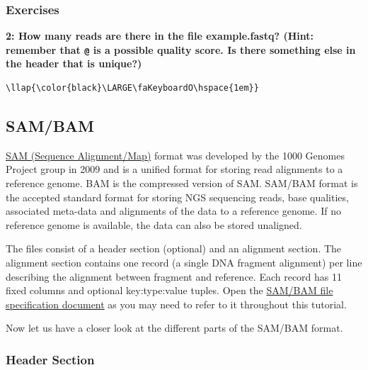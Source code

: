 \documentclass[11pt]{article}
\begin{document}
\hypertarget{exercises}{%
\subsubsection{Exercises}\label{exercises}}

\textbf{2: How many reads are there in the file example.fastq? (Hint:
remember that \texttt{@} is a possible quality score. Is there something
else in the header that is unique?)}

\begin{terminalinput}
\begin{Verbatim}[commandchars=\\\{\}]
\llap{\color{black}\LARGE\faKeyboardO\hspace{1em}}
\end{Verbatim}
\end{terminalinput}

    \hypertarget{sambam}{%
\subsection{SAM/BAM}\label{sambam}}

\href{https://samtools.github.io/hts-specs/SAMv1.pdf}{SAM (Sequence
Alignment/Map)} format was developed by the 1000 Genomes Project group
in 2009 and is a unified format for storing read alignments to a
reference genome. BAM is the compressed version of SAM. SAM/BAM format
is the accepted standard format for storing NGS sequencing reads, base
qualities, associated meta-data and alignments of the data to a
reference genome. If no reference genome is available, the data can also
be stored unaligned.

The files consist of a header section (optional) and an alignment
section. The alignment section contains one record (a single DNA
fragment alignment) per line describing the alignment between fragment
and reference. Each record has 11 fixed columns and optional
key:type:value tuples. Open the
\href{https://samtools.github.io/hts-specs/SAMv1.pdf}{SAM/BAM file
specification document} as you may need to refer to it throughout this
tutorial.

Now let us have a closer look at the different parts of the SAM/BAM
format.

\hypertarget{header-section}{%
\subsubsection{Header Section}\label{header-section}}
\end{document}
